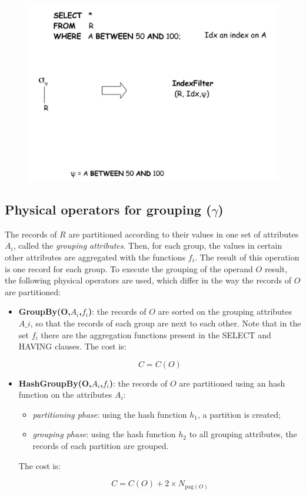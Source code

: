 \begin{figure}[h!]
		\centering
		\includegraphics[scale = 0.7]{img/relop5.jpg}
		\label{relop5}
\end{figure}


\subsection{Physical operators for grouping ($\gamma$)}
The records of $R$ are partitioned according to their values in one set of attributes $A_i$, called the \textit{grouping attributes}. Then, for each group, the values in certain other attributes are aggregated with the functions $f_i$. The result of this operation is one record for each group. 
To execute the grouping of the operand $O$ result, the following physical operators are used, which differ in the way the records of $O$ are partitioned:

\begin{itemize}
    \item \textbf{GroupBy(O,$A_i$,${f_i}$)}: the records of $O$ are sorted on the grouping attributes $A\_i$, so that the records of each group are next to each other. Note that in the set ${f_i}$ there are the aggregation functions present in the SELECT and HAVING clauses. The cost is:

    $$
    C = C(O)
    $$

    \item \textbf{HashGroupBy(O,${A_i}$,${f_i}$)}: the records of $O$ are partitioned using an hash function on the attributes ${A_i}$:
    
    \begin{itemize}
        \item \textit{partitioning phase}: using the hash function $h_1$, a partition is created;
        \item \textit{grouping phase}: using the hash function $h_2$ to all grouping attributes, the records of each partition are grouped.
    \end{itemize}
    
    The cost is:

    $$
    C = C(O) + 2 \times N_{\text{pag}(O)}
    $$
    
\end{itemize}

